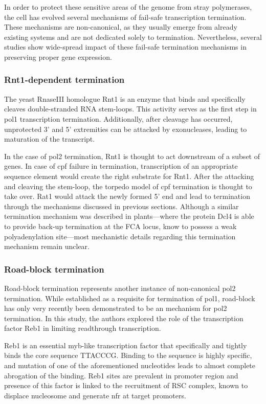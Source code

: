 In order to protect these sensitive areas of the genome from stray polymerases, the cell has evolved several mechanisms of fail-safe transcription termination.
These mechanisms are non-canonical, as they usually emerge from already existing systems and are not dedicated solely to termination.
Nevertheless, several studies show wide-spread impact of these fail-safe termination mechanisms in preserving proper gene expression.

\subsubsection{Rnt1-dependent termination}

The yeast RnaseIII homologue Rnt1 is an enzyme that binds and specifically cleaves double-stranded RNA stem-loops. 
This activity serves as the first step in \gls{pol1} transcription termination.
Additionally, after cleavage has occurred, unprotected 3' and 5' extremities can be attacked by exonucleases, leading to maturation of the transcript.

In the case of \gls{pol2} termination, Rnt1 is thought to act downstream of a subset of genes.
In case of \gls{cpf} failure in termination, transcription of an appropriate sequence element would create the right substrate for Rnt1.
After the attacking and cleaving the stem-loop, the torpedo model of \gls{cpf} termination is thought to take over.
Rat1 would attack the newly formed 5' end and lead to termination through the mechanisms discussed in previous sections.
Although a similar termination mechanism was described in plants---where the protein Dcl4 is able to provide back-up termination at the FCA locus, know to possess a weak polyadenylation site---most mechanistic details regarding this termination mechanism remain unclear.

\subsubsection{Road-block termination}
  
Road-block termination represents another instance of non-canonical \gls{pol2} termination.
While established as a requisite for termination of \gls{pol1}, road-block has only very recently been demonstrated to be an \invivo{} mechanism for \gls{pol2} termination\cite{colin:2014:roadblock}.
In this study, the authors explored the role of the transcription factor Reb1 in limiting readthrough transcription.

Reb1 is an essential myb-like transcription factor that specifically and tightly binds the core sequence TTACCCG.
Binding to the sequence is highly specific, and mutation of one of the aforementioned nucleotides leads to almost complete abrogation of the binding.
Reb1 sites are prevalent in promoter region and presence of this factor is linked to the recruitment of RSC complex, known to displace nucleosome and generate \gls{nfr} at target promoters.

